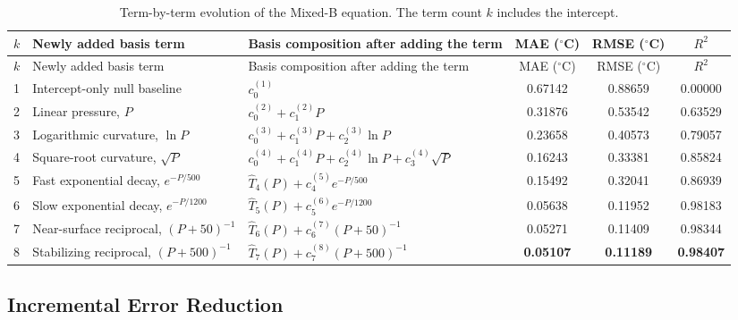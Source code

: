 \documentclass[10pt]{article}
\begin{document}
\begingroup
\small
\setlength{\tabcolsep}{4pt}
\renewcommand{\arraystretch}{1.12}
\begin{longtable}{C{0.55cm}L{3.05cm}L{5.6cm}ccc}
\caption{Term-by-term evolution of the Mixed-B equation. The term count $k$ includes the intercept.}\\
\toprule
$k$ & Newly added basis term & Basis composition after adding the term & MAE ($^\circ$C) & RMSE ($^\circ$C) & $R^2$ \\
\midrule
\endfirsthead
\toprule
$k$ & Newly added basis term & Basis composition after adding the term & MAE ($^\circ$C) & RMSE ($^\circ$C) & $R^2$ \\
\midrule
{} & Intercept-only null baseline & $c_0^{(1)}$ & 0.67142 & 0.88659 & 0.00000 \\
2 & Linear pressure, $P$ & $c_0^{(2)}+c_1^{(2)}P$ & 0.31876 & 0.53542 & 0.63529 \\
3 & Logarithmic curvature, $\ln P$ & $c_0^{(3)}+c_1^{(3)}P+c_2^{(3)}\ln P$ & 0.23658 & 0.40573 & 0.79057 \\
4 & Square-root curvature, $\sqrt{P}$ & $c_0^{(4)}+c_1^{(4)}P+c_2^{(4)}\ln P+c_3^{(4)}\sqrt{P}$ & 0.16243 & 0.33381 & 0.85824 \\
5 & Fast exponential decay, $e^{-P/500}$ & $\hat{T}_4(P)+c_4^{(5)}e^{-P/500}$ & 0.15492 & 0.32041 & 0.86939 \\
6 & Slow exponential decay, $e^{-P/1200}$ & $\hat{T}_5(P)+c_5^{(6)}e^{-P/1200}$ & 0.05638 & 0.11952 & 0.98183 \\
7 & Near-surface reciprocal, $(P+50)^{-1}$ & $\hat{T}_6(P)+c_6^{(7)}(P+50)^{-1}$ & 0.05271 & 0.11409 & 0.98344 \\
8 & Stabilizing reciprocal, $(P+500)^{-1}$ & $\hat{T}_7(P)+c_7^{(8)}(P+500)^{-1}$ & \textbf{0.05107} & \textbf{0.11189} & \textbf{0.98407} \\
\bottomrule
\end{longtable}
\endgroup

\subsection{Incremental Error Reduction}
\end{document}
